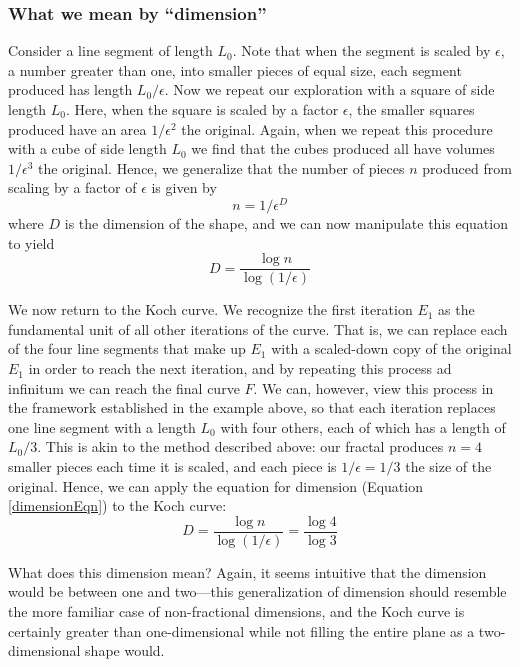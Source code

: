 \subsubsection{What we mean by ``dimension''}
Consider a line segment of length $ L_0 $. Note that when the segment is scaled by $\epsilon$, a number greater than one, into smaller pieces of equal size, each segment produced has length $L_0/\epsilon$. Now we repeat our exploration with a square of side length $ L_0 $. Here, when the square is scaled by a factor $\epsilon$, the smaller squares produced have an area $1/\epsilon^2$ the original. Again, when we repeat this procedure with a cube of side length $ L_0 $ we find that the cubes produced all have volumes $1/\epsilon^3$ the original. Hence, we generalize that the number of pieces $n$ produced from scaling by a factor of $\epsilon$ is given by 
\begin{equation}n = 1/\epsilon^D\end{equation}
where $D$ is the dimension of the shape, and we can now manipulate this equation to yield
\begin{equation}\label{dimensionEqn} D = \frac{\log{n}}{\log{(1/\epsilon)}}\end{equation}

We now return to the Koch curve. We recognize the first iteration $E_1$ as the fundamental unit of all other iterations of the curve. That is, we can replace each of the four line segments that make up $E_1$ with a scaled-down copy of the original $E_1$ in order to reach the next iteration, and by repeating this process ad infinitum we can reach the final curve $F$. We can, however, view this process in the framework established in the example above, so that each iteration replaces one line segment with a length $L_0$ with four others, each of which has a length of $L_0/3$. This is akin to the method described above: our fractal produces $n = 4$ smaller pieces each time it is scaled, and each piece is $1/\epsilon = 1/3$ the size of the original. Hence, we can apply the equation for dimension (Equation \ref{dimensionEqn}) to the Koch curve:
\begin{equation}D = \frac{\log{n}}{\log{(1/\epsilon)}} = \frac{\log{4}}{\log{3}} \end{equation}

What does this dimension mean? Again, it seems intuitive that the dimension would be between one and two---this generalization of dimension should resemble the more familiar case of non-fractional dimensions, and the Koch curve is certainly greater than one-dimensional while not filling the entire plane as a two-dimensional shape would.

